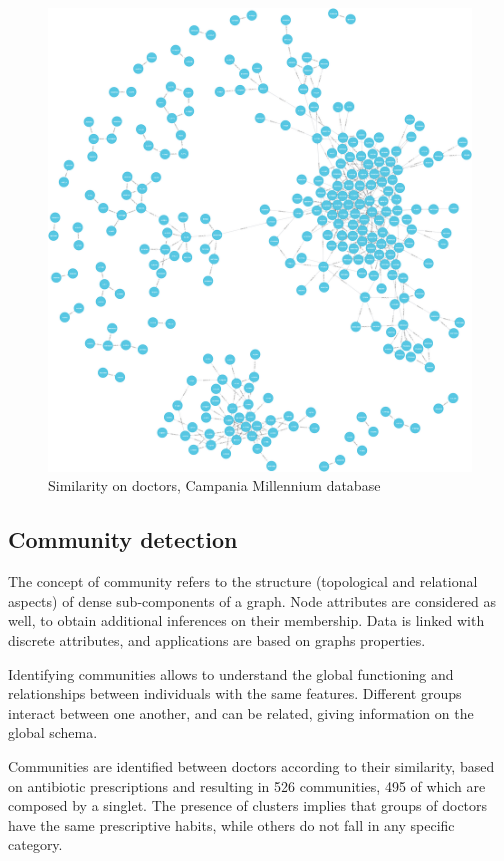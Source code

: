 \begin{figure}[h]
	\centering
	\includegraphics[scale=0.15]{./images/similarity-doctors.png}
	\caption{\small Similarity on doctors, Campania Millennium database}
\end{figure}

\subsection{Community detection}
The concept of community refers to the structure (topological and relational aspects) of dense sub-components of a graph. Node attributes are considered as well, to obtain additional inferences on their membership. Data is linked with discrete attributes, and applications are based on graphs properties.

Identifying communities allows to understand the global functioning and relationships between individuals with the same features. Different groups interact between one another, and can be related, giving information on the global schema.

Communities are identified between doctors according to their similarity, based on antibiotic prescriptions and resulting in 526 communities, 495 of which are composed by a singlet. The presence of clusters implies that groups of doctors have the same prescriptive habits, while others do not fall in any specific category.

